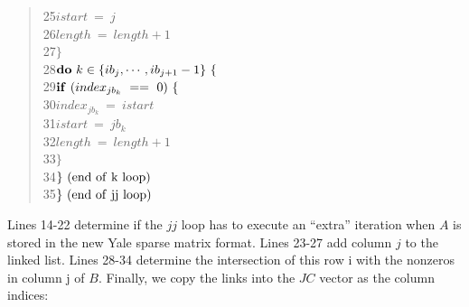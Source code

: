 \begin{quote}
25\hspace*{16em}$             istart\ =\ j $ \\
26\hspace*{16em}$             length\ =\ length + 1 $ \\
27\hspace*{16em}$             \} $ \\
28\hspace*{12em}$         {\bf do}\ k\in\{ib_{j},\cdots,ib_{j+1}-1\}\ \{ $ \\
29\hspace*{16em}$             {\bf if}\ (index_{jb_{k}}\ ==\ 0)\ \{ $ \\
30\hspace*{20em}$                 index_{jb_{k}}\ =\ istart $ \\
31\hspace*{20em}$                 istart\ =\ jb_{k} $ \\
32\hspace*{20em}$                 length\ =\ length + 1 $ \\
33\hspace*{20em}$                 \} $ \\
34\hspace*{16em}$             \}\ (\rm end\ of\ k\ loop) $ \\
35\hspace*{12em}$         \}\ (\rm end\ of\ jj\ loop) $
\end{quote}
Lines 14-22 determine if the $jj$ loop has to execute an ``extra'' iteration
when $A$ is stored in the new Yale sparse matrix format.  Lines 23-27 add
column $j$ to the linked list.  Lines 28-34 determine the intersection of this
row i with the nonzeros in column j of $B$.  Finally, we copy the links into
the $JC$ vector as the column indices:

